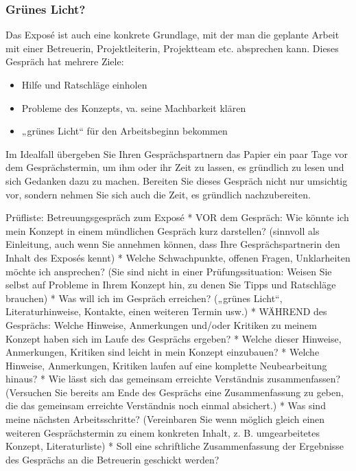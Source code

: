 \documentclass[]{article}
\providecommand{\tightlist}{%
  \setlength{\itemsep}{0pt}\setlength{\parskip}{0pt}}
\begin{document}
\subsubsection{Grünes Licht?}\label{grunes-licht}

Das Exposé ist auch eine konkrete Grundlage, mit der man die geplante
Arbeit mit einer Betreuerin, Projektleiterin, Projektteam etc.
absprechen kann. Dieses Gespräch hat mehrere Ziele:

\begin{itemize}
\tightlist
\item
  Hilfe und Ratschläge einholen
\item
  Probleme des Konzepts, va. seine Machbarkeit klären
\item
  „grünes Licht`` für den Arbeitsbeginn bekommen
\end{itemize}

Im Idealfall übergeben Sie Ihren Gesprächspartnern das Papier ein paar
Tage vor dem Gesprächstermin, um ihm oder ihr Zeit zu lassen, es
gründlich zu lesen und sich Gedanken dazu zu machen. Bereiten Sie dieses
Gespräch nicht nur umsichtig vor, sondern nehmen Sie sich auch die Zeit,
es gründlich nachzubereiten.

Prüfliste: Betreuungsgespräch zum Exposé * VOR dem Gespräch: Wie könnte
ich mein Konzept in einem mündlichen Gespräch kurz darstellen? (sinnvoll
als Einleitung, auch wenn Sie annehmen können, dass Ihre
Gesprächspartnerin den Inhalt des Exposés kennt) * Welche Schwachpunkte,
offenen Fragen, Unklarheiten möchte ich ansprechen? (Sie sind nicht in
einer Prüfungssituation: Weisen Sie selbst auf Probleme in Ihrem Konzept
hin, zu denen Sie Tipps und Ratschläge brauchen) * Was will ich im
Gespräch erreichen? („grünes Licht``, Literaturhinweise, Kontakte, einen
weiteren Termin usw.) * WÄHREND des Gesprächs: Welche Hinweise,
Anmerkungen und/oder Kritiken zu meinem Konzept haben sich im Laufe des
Gesprächs ergeben? * Welche dieser Hinweise, Anmerkungen, Kritiken sind
leicht in mein Konzept einzubauen? * Welche Hinweise, Anmerkungen,
Kritiken laufen auf eine komplette Neubearbeitung hinaus? * Wie lässt
sich das gemeinsam erreichte Verständnis zusammenfassen? (Versuchen Sie
bereits am Ende des Gesprächs eine Zusammenfassung zu geben, die das
gemeinsam erreichte Verständnis noch einmal absichert.) * Was sind meine
nächsten Arbeitsschritte? (Vereinbaren Sie wenn möglich gleich einen
weiteren Gesprächstermin zu einem konkreten Inhalt, z. B. umgearbeitetes
Konzept, Literaturliste) * Soll eine schriftliche Zusammenfassung der
Ergebnisse des Gesprächs an die Betreuerin geschickt werden?
\end{document}
